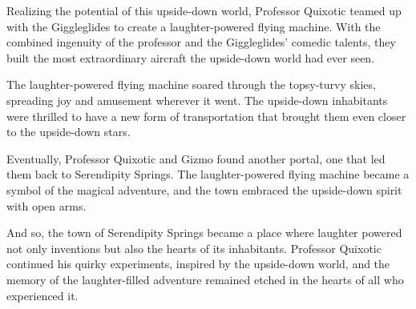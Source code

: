 \documentclass[10pt]{article}
\begin{document}
\begin{multicols*}{4}
Realizing the potential of this upside-down world, Professor Quixotic teamed up with the Giggleglides to create a laughter-powered flying machine. With the combined ingenuity of the professor and the Giggleglides' comedic talents, they built the most extraordinary aircraft the upside-down world had ever seen.

The laughter-powered flying machine soared through the topsy-turvy skies, spreading joy and amusement wherever it went. The upside-down inhabitants were thrilled to have a new form of transportation that brought them even closer to the upside-down stars.

Eventually, Professor Quixotic and Gizmo found another portal, one that led them back to Serendipity Springs. The laughter-powered flying machine became a symbol of the magical adventure, and the town embraced the upside-down spirit with open arms.

And so, the town of Serendipity Springs became a place where laughter powered not only inventions but also the hearts of its inhabitants. Professor Quixotic continued his quirky experiments, inspired by the upside-down world, and the memory of the laughter-filled adventure remained etched in the hearts of all who experienced it.


\end{multicols*}
\end{document}
